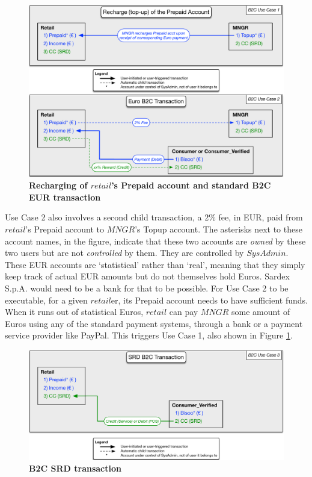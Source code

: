 \begin{figure}[htbp]
\centering
\includegraphics[width=15cm]{Figures/B2C1}
\caption{\small\textbf{Recharging of $retail$'s Prepaid account and standard B2C EUR transaction}}
\label{fig:B2C1}
\end{figure}

Use Case 2 also involves a second child transaction, a 2\% fee, in EUR, paid from $retail$'s Prepaid account to $MNGR$'s Topup account. The asterisks next to these account names, in the figure, indicate that these two accounts are \emph{owned} by these two users but are not \emph{controlled} by them. They are controlled by $SysAdmin$. These EUR accounts are `statistical' rather than `real', meaning that they simply keep track of actual EUR amounts but do not themselves hold Euros. Sardex S.p.A. would need to be a bank for that to be possible. For Use Case 2 to be executable, for a given $retail$er, its Prepaid account needs to have sufficient funds. When it runs out of statistical Euros, $retail$ can pay $MNGR$ some amount of Euros using any of the standard payment systems, through a bank or a payment service provider like PayPal. This triggers Use Case 1, also shown in Figure \ref{fig:B2C1}.

\begin{figure}[htbp]
\centering
\includegraphics[width=15cm]{Figures/B2C2}
\caption{\small\textbf{B2C SRD transaction}}
\label{fig:B2C2}
\end{figure}

